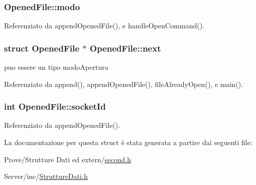 \subsubsection[{modo}]{ Opened\+File\+::modo}\label{structOpenedFile_ab2345215b095722d1339d571cfe287c7}


Referenziato da append\+Opened\+File(), e handle\+Open\+Command().

\hypertarget{structOpenedFile_a9b8c8b995cdda6da249a6ce9a9df98b2}{}
\subsubsection[{next}]{\setlength{\rightskip}{0pt plus 5cm}struct {\bf Opened\+File} $\ast$ Opened\+File\+::next}\label{structOpenedFile_a9b8c8b995cdda6da249a6ce9a9df98b2}


puo\textquotesingle{} essere un tipo modo\+Apertura 



Referenziato da append(), append\+Opened\+File(), file\+Already\+Open(), e main().

\hypertarget{structOpenedFile_a2af35018ecff06dbd349d464c815038a}{}
\subsubsection[{socket\+Id}]{\setlength{\rightskip}{0pt plus 5cm}int Opened\+File\+::socket\+Id}\label{structOpenedFile_a2af35018ecff06dbd349d464c815038a}


Referenziato da append\+Opened\+File().



La documentazione per questa struct è stata generata a partire dai seguenti file\+:\begin{DoxyCompactItemize}
\item 
Prove/\+Strutture Dati ed extern/\hyperlink{second_8h}{second.\+h}\item 
Server/inc/\hyperlink{StruttureDati_8h}{Strutture\+Dati.\+h}\end{DoxyCompactItemize}
